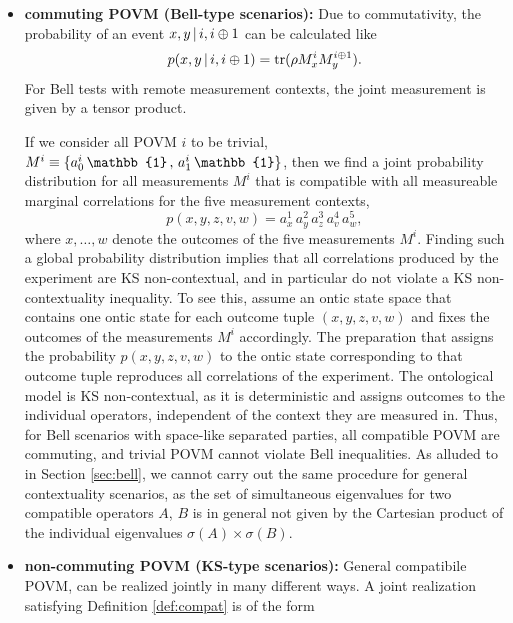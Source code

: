 \begin{itemize}
    \item \textbf{commuting POVM (Bell-type scenarios):}
    Due to commutativity, the probability of an event $x,y\thinspace\vert\thinspace i,i\oplus 1$ can be calculated like
    \begin{equation*}
        p(x,y\thinspace\vert\thinspace i,i\oplus 1) = \operatorname{tr}(\rho M_x^i M_y^{i\oplus 1}).
    \end{equation*}
    For Bell tests with remote measurement contexts, the joint measurement is given by a tensor product.
    
    If we consider all POVM $i$ to be trivial, $M^i\equiv\{a^i_0\thinspace\mathbb{1}\thinspace,\thinspace a^i_1\thinspace\mathbb{1}\}$, then we find a joint probability distribution for all measurements $M^i$ that is compatible with all measureable marginal correlations for the five measurement contexts,
    \begin{equation*}
        p(x,y,z,v,w)=a^1_{x}\,a^2_{y}\,a^3_{z}\,a^4_{v}\,a^5_{w},
    \end{equation*}
    where $x,\dots,w$ denote the outcomes of the five measurements $M^i$. Finding such a global probability distribution implies that all correlations produced by the experiment are KS non-contextual, and in particular do not violate a KS non-contextuality inequality. To see this, assume an ontic state space that contains one ontic state for each outcome tuple $(x,y,z,v,w)$ and fixes the outcomes of the measurements $M^i$ accordingly. The preparation that assigns the probability $p(x,y,z,v,w)$ to the ontic state corresponding to that outcome tuple reproduces all correlations of the experiment. The ontological model is KS non-contextual, as it is deterministic and assigns outcomes to the individual operators, independent of the context they are measured in. Thus, for Bell scenarios with space-like separated parties, all compatible POVM are commuting, and trivial POVM cannot violate Bell inequalities. As alluded to in Section \ref{sec:bell}, we cannot carry out the same procedure for general contextuality scenarios, as the set of simultaneous eigenvalues for two compatible operators $A$, $B$ is in general not given by the Cartesian product of the individual eigenvalues $\sigma(A)\times\sigma(B)$.
    \item \textbf{non-commuting POVM (KS-type scenarios):}
    General compatibile POVM, can be realized jointly in many different ways. A joint realization satisfying Definition \ref{def:compat} is of the form \begin{equation*}

\end{equation*}
\end{itemize}
